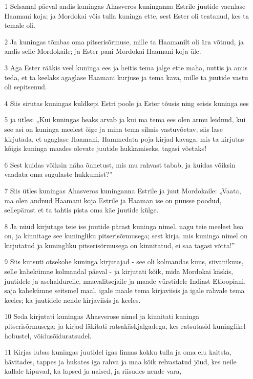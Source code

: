 \par 1 Selsamal päeval andis kuningas Ahasveros kuninganna Estrile juutide vaenlase Haamani koja; ja Mordokai võis tulla kuninga ette, sest Ester oli teatanud, kes ta temale oli.
\par 2 Ja kuningas tõmbas oma pitserisõrmuse, mille ta Haamanilt oli ära võtnud, ja andis selle Mordokaile; ja Ester pani Mordokai Haamani koja üle.
\par 3 Aga Ester rääkis veel kuninga ees ja heitis tema jalge ette maha, nuttis ja anus teda, et ta keelaks agaglase Haamani kurjuse ja tema kava, mille ta juutide vastu oli sepitsenud.
\par 4 Siis sirutas kuningas kuldkepi Estri poole ja Ester tõusis ning seisis kuninga ees
\par 5 ja ütles: „Kui kuningas heaks arvab ja kui ma tema ees olen armu leidnud, kui see asi on kuninga meelest õige ja mina tema silmis vastuvõetav, siis lase kirjutada, et agaglase Haamani, Hammedata poja kirjad kavaga, mis ta kirjutas kõigis kuninga maades olevate juutide hukkamiseks, tagasi võetaks!
\par 6 Sest kuidas võiksin näha õnnetust, mis mu rahvast tabab, ja kuidas võiksin vaadata oma sugulaste hukkumist?”
\par 7 Siis ütles kuningas Ahasveros kuninganna Estrile ja juut Mordokaile: „Vaata, ma olen andnud Haamani koja Estrile ja Haaman ise on puusse poodud, sellepärast et ta tahtis pista oma käe juutide külge.
\par 8 Ja nüüd kirjutage teie ise juutide pärast kuninga nimel, nagu teie meelest hea on, ja kinnitage see kuningliku pitserisõrmusega; sest kirja, mis kuninga nimel on kirjutatud ja kuningliku pitserisõrmusega on kinnitatud, ei saa tagasi võtta!”
\par 9 Siis kutsuti otsekohe kuninga kirjutajad - see oli kolmandas kuus, siivanikuus, selle kahekümne kolmandal päeval - ja kirjutati kõik, mida Mordokai käskis, juutidele ja asehaldureile, maavalitsejaile ja maade vürstidele Indiast Etioopiani, saja kahekümne seitsmel maal, igale maale tema kirjaviisis ja igale rahvale tema keeles; ka juutidele nende kirjaviisis ja keeles.
\par 10 Seda kirjutati kuningas Ahasverose nimel ja kinnitati kuninga pitserisõrmusega; ja kirjad läkitati ratsakäskjalgadega, kes ratsutasid kuninglikel hobustel, võidusõiduratsudel.
\par 11 Kirjas lubas kuningas juutidel igas linnas kokku tulla ja oma elu kaitsta, hävitades, tappes ja hukates iga rahva ja maa kõik relvastatud jõud, kes neile kallale kipuvad, ka lapsed ja naised, ja riisudes nende vara,
